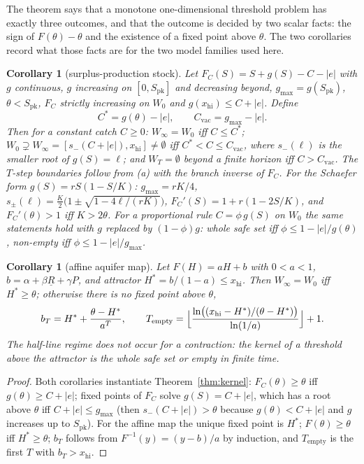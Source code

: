 \documentclass[11pt,a4paper]{article}
\theoremstyle{plain}
\newtheorem{corollary}[theorem]{Corollary}
\theoremstyle{definition}
\theoremstyle{remark}
\newcommand{\safe}{W_0}
\newcommand{\LRP}{\theta}
\newcommand{\Cstar}{C^{*}}
\newcommand{\Cvac}{C_{\mathrm{vac}}}
\newcommand{\gmax}{g_{\max}}
\newcommand{\Hstar}{H^{*}}
\newcommand{\Tempty}{T_{\mathrm{empty}}}
\begin{document}
The theorem says that a monotone one-dimensional threshold problem has exactly three outcomes, and that the outcome is decided by two scalar facts: the sign of $F(\LRP)-\LRP$ and the existence of a fixed point above $\LRP$. The two corollaries record what those facts are for the two model families used here.

\begin{corollary}[surplus-production stock]\label{cor:cod}
Let $F_C(S)=S+g(S)-C-|e|$ with $g$ continuous, $g$ increasing on $[0,S_{\mathrm{pk}}]$ and decreasing beyond, $\gmax=g(S_{\mathrm{pk}})$, $\LRP<S_{\mathrm{pk}}$, $F_C$ strictly increasing on $\safe$ and $g(x_{\mathrm{hi}})\le C+|e|$. Define
\[
\Cstar=g(\LRP)-|e|,\qquad \Cvac=\gmax-|e|.
\]
Then for a constant catch $C\ge0$: $W_\infty=\safe$ iff $C\le\Cstar$; $\safe\supsetneq W_\infty=[s_-(C+|e|),x_{\mathrm{hi}}]\neq\emptyset$ iff $\Cstar<C\le\Cvac$, where $s_-(\ell)$ is the smaller root of $g(S)=\ell$; and $W_T=\emptyset$ beyond a finite horizon iff $C>\Cvac$. The $T$-step boundaries follow from (a) with the branch inverse of $F_C$. For the Schaefer form $g(S)=rS(1-S/K)$: $\gmax=rK/4$, $s_\pm(\ell)=\tfrac K2\bigl(1\pm\sqrt{1-4\ell/(rK)}\bigr)$, $F_C'(S)=1+r(1-2S/K)$, and $F_C'(\LRP)>1$ iff $K>2\LRP$. For a proportional rule $C=\phi\,g(S)$ on $\safe$ the same statements hold with $g$ replaced by $(1-\phi)g$: whole safe set iff $\phi\le 1-|e|/g(\LRP)$, non-empty iff $\phi\le1-|e|/\gmax$.
\end{corollary}

\begin{corollary}[affine aquifer map]\label{cor:edw}
Let $F(H)=aH+b$ with $0<a<1$, $b=\alpha+\beta\underline R+\gamma P$, and attractor $\Hstar=b/(1-a)\le x_{\mathrm{hi}}$. Then $W_\infty=\safe$ iff $\Hstar\ge\LRP$; otherwise there is no fixed point above $\LRP$,
\[
b_T=\Hstar+\frac{\LRP-\Hstar}{a^{T}},\qquad \Tempty=\Bigl\lfloor\frac{\ln\bigl((x_{\mathrm{hi}}-\Hstar)/(\LRP-\Hstar)\bigr)}{\ln(1/a)}\Bigr\rfloor+1 .
\]
The half-line regime does not occur for a contraction: the kernel of a threshold above the attractor is the whole safe set or empty in finite time.
\end{corollary}
\begin{proof}
Both corollaries instantiate Theorem~\ref{thm:kernel}: $F_C(\LRP)\ge\LRP$ iff $g(\LRP)\ge C+|e|$; fixed points of $F_C$ solve $g(S)=C+|e|$, which has a root above $\LRP$ iff $C+|e|\le\gmax$ (then $s_-(C+|e|)>\LRP$ because $g(\LRP)<C+|e|$ and $g$ increases up to $S_{\mathrm{pk}}$). For the affine map the unique fixed point is $\Hstar$; $F(\LRP)\ge\LRP$ iff $\Hstar\ge\LRP$; $b_T$ follows from $F^{-1}(y)=(y-b)/a$ by induction, and $\Tempty$ is the first $T$ with $b_T>x_{\mathrm{hi}}$.
\end{proof}
\end{document}
